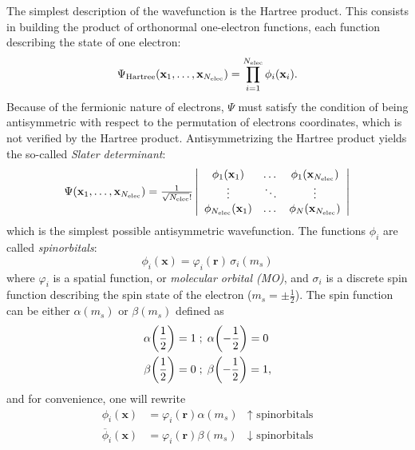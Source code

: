 \documentclass[./thesis.tex]{subfiles}
\begin{document}
The simplest description of the wavefunction is the Hartree product. This consists in 
building the product of orthonormal one-electron functions, each function describing the state of
one electron:
\begin{equation}
\Psi_{\text{Hartree}}({\bf x}_1,\dots,{\bf x}_{{N_\text{elec}}})  = \prod_{i=1}^{N_\text{elec}} \phi_i(\textbf{x}_i).
\end{equation}
Because of the fermionic nature of electrons, $\Psi$ must satisfy the condition of being antisymmetric with respect to the permutation of electrons coordinates, which is not verified by the Hartree product.
Antisymmetrizing the Hartree product yields the so-called \emph{Slater determinant}:
\begin{equation}
\begin{array}{c}
 \Psi({\bf x}_1,\dots,{\bf x}_{{N_\text{elec}}}) = 
\frac{1}{\sqrt{{N_\text{elec}}}!} \left|
 \begin{array}{ccc}
 \phi_1({\bf x}_1) & \dots & \phi_1({\bf x}_{{N_\text{elec}}}) \\
 \vdots              & \ddots &   \vdots             \\
 \phi_{{N_\text{elec}}}({\bf x}_1) & \dots & \phi_N({\bf x}_{{N_\text{elec}}}) \\
 \end{array}
\right| \\ 
\end{array} 
\label{eq:slater1}
\end{equation}
which is the simplest possible antisymmetric wavefunction.
The functions $\phi_i$ are called \emph{spinorbitals}:
\begin{equation}
\phi_i(\textbf{x}) = \varphi_i(\textbf{r}) \, \sigma_i(m_s)
\end{equation}
where $\varphi_i$ is a spatial function, or \emph{molecular orbital (MO)}, and $\sigma_i$ is a
discrete spin function describing the spin state of the electron ($m_s = \pm \frac{1}{2}$). The spin
function can be either $\alpha(m_s)$ or $\beta(m_s)$ defined as
\begin{align}
\alpha \qty(\frac{1}{2}) = 1  \; &; \;  \alpha \qty(-\frac{1}{2}) = 0   \\ \nonumber
\beta  \qty(\frac{1}{2}) = 0  \; &; \;  \beta  \qty(-\frac{1}{2}) = 1,
\end{align}
and for convenience, one will rewrite
\begin{align}
\phi_i(\textbf{x}) & = \varphi_i(\mathbf{r}) \alpha(m_s) & \text{$\uparrow$ spinorbitals} \\ \nonumber
\overline{\phi}_i(\textbf{x}) & = \varphi_i(\mathbf{r}) \beta(m_s) & \text{$\downarrow$ spinorbitals}
\end{align}
\end{document}
